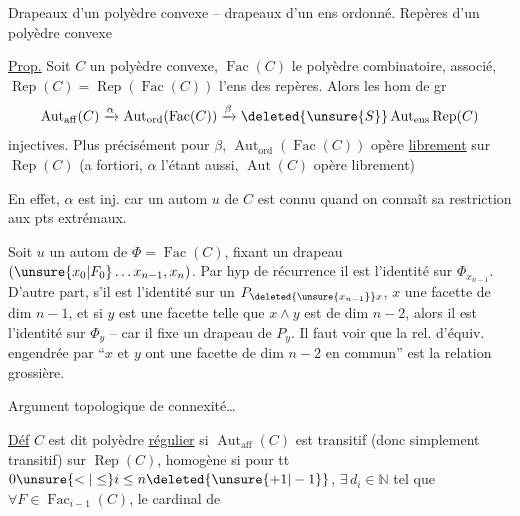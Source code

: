 \margin{$\leftarrow$}Drapeaux d'un polyèdre convexe -- drapeaux d'un ens ordonné. Repères d'un polyèdre convexe

\uline{Prop.} Soit $C$ un polyèdre convexe, $\operatorname{Fac}(C)$ le polyèdre combinatoire, associé, $\operatorname{Rep}(C)=\operatorname{Rep}(\operatorname{Fac}(C))$ l'ens des repères. Alors les  hom de gr
\[
\operatorname{Aut}_{\mathrm{aff}}(C)\xrightarrow{\alpha}\operatorname{Aut}_{\mathrm{ord}}(\operatorname{Fac}(C))\xrightarrow{\beta}\deleted{\unsure{S}}\operatorname{Aut}_{\mathrm{ens}}\operatorname{Rep}(C)
\]
 injectives. Plus précisément pour $\beta$, $\operatorname{Aut}_{\mathrm{ord}}(\operatorname{Fac}(C))$ opère \uline{librement} sur $\operatorname{Rep}(C)$ (a fortiori, $\alpha$ l'étant aussi, $\operatorname{Aut}(C)$ opère librement)

En effet, $\alpha$ est inj. car un autom $u$ de $C$ est connu quand on connaît sa restriction aux pts extrémaux.

Soit $u$ un autom de $\Phi=\operatorname{Fac}(C)$, fixant un drapeau $(\unsure{x_0|F_0}\ldots x_{n-1},x_n)$. Par hyp de récurrence il  est l'identité sur $\Phi_{x_{n-1}}$. D'autre part, s'il est l'identité sur un  $P_{\deleted{\unsure{x_{n-1}}}x}$, $x$ une facette de dim $n-1$, et si $y$ est une facette telle que $x\wedge y$ est de dim $n-2$, alors il est l'identité sur $\Phi_y$ -- car il fixe un drapeau de $P_y$. Il faut voir que la rel. d'équiv.  engendrée par ``$x$ et $y$ ont une facette de dim $n-2$ en commun'' est la relation grossière. 

Argument topologique de connexité\ldots

\uline{Déf} $C$  est dit polyèdre \uline{régulier} si $\operatorname{Aut}_{\mathrm{aff}}(C)$ est transitif (donc simplement transitif) sur $\operatorname{Rep}(C)$, homogène si pour tt $0\unsure{<|\leq}i\leq n\deleted{\unsure{+1|-1}}$, $\exists\,d_i\in\mathbb N$ tel que $\forall F\in\operatorname{Fac}_{i-1}(C)$, le cardinal de
